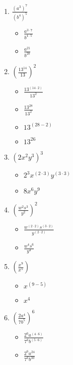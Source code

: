 \documentclass{article}
\begin{document}
\begin{onehalfspace}
\begin{enumerate}
        \item $\frac{\left( a^{3} \right)^{7}}{\left( b^{4} \right)^{5}}$
        \begin{itemize}
            \item $\frac{a^{3 \cdot 7}}{b^{4 \cdot 5}}$
            \item $\frac{a^{21}}{b^{20}}$
        \end{itemize}
        

        \item $\left( \frac{13^{14}}{13} \right)^{2}$
        \begin{itemize}
            \item $\frac{13^{(14 \cdot 2)}}{13^{2}}$
            \item $\frac{13^{28}}{13^{2}}$
            \item $13^{(28 - 2)}$
            \item $13^{26}$
        \end{itemize}
        

        \item $\left( 2x^{2}y^{3} \right)^{3}$
        \begin{itemize}
            \item $2^{3}x^{(2 \cdot 3)}y^{(3 \cdot 3)}$
            \item $8x^{6}y^{9}$
        \end{itemize}
        

        \item $\left( \frac{w^{2}s^{3}}{y^{2}} \right)^{2}$
        \begin{itemize}
            \item $\frac{w^{(2 \cdot 2)}s^{(3 \cdot 2)}}{y^{(2 \cdot 2)}}$
            \item $\frac{w^{4}s^{6}}{y^{4}}$
        \end{itemize}
        
        
        \item $\left( \frac{x^{9}}{x^{5}} \right)$
        \begin{itemize}
            \item $x^{(9 - 5)}$
            \item $x^{4}$
        \end{itemize}
        

        \item $\left( \frac{2a^{4}}{7b^{5}} \right)^{6}$
        \begin{itemize}
            \item $\frac{2^{6}a^{(4 \cdot 6)}}{7^{6}b^{(5 \cdot 6)}}$
            \item $\frac{2^{6}a^{24}}{7^{6}b^{30}}$
        \end{itemize}


\end{enumerate}
\end{onehalfspace}
\end{document}
